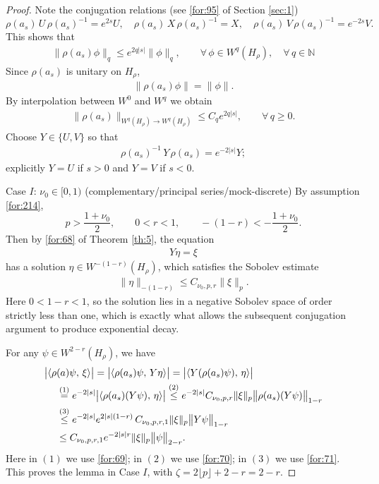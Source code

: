 \documentclass[11 pt]{amsart}
\newcommand{\NN}{\mathbb{N}}
\newcommand{\norm}[1]{\lVert#1\rVert}
\theoremstyle{definition}
\numberwithin{equation}{section}
\begin{document}
\begin{proof}
Note the conjugation relations (see \eqref{for:95} of Section \ref{sec:1})
\[
\rho(a_s)\,U\,\rho(a_s)^{-1}=e^{2s}U,\quad \rho(a_s)\,X\,\rho(a_s)^{-1}=X,\quad \rho(a_s)\,V\,\rho(a_s)^{-1}=e^{-2s}V.
\]
 This shows that
\begin{align*}
 \norm{\rho(a_s)\phi}_q\leq e^{2q|s|}\norm{\phi}_{q},\qquad \forall\,\phi\in W^{q}(H_\rho),\quad \forall\,q\in\NN
\end{align*}
Since $\rho(a_s)$ is unitary on $H_\rho$,
\begin{align*}
 \norm{\rho(a_s)\phi}=\norm{\phi}.
\end{align*}
By interpolation between $W^0$ and $W^q$ we obtain
\begin{align}\label{for:71}
 \|\rho(a_s)\|_{W^{q}(H_\rho)\to W^{q}(H_\rho)}\le C_qe^{2q|s|},\qquad \forall\, q\geq0.
\end{align}
Choose $Y\in\{U,V\}$ so that
\begin{align}\label{for:69}
\rho(a_{s})^{-1}\,Y\,\rho(a_s)=e^{-2|s|}Y;
\end{align}
explicitly $Y=U$ if $s>0$ and $Y=V$ if $s<0$.

Case $I$: $\nu_0\in [0,1)$ (complementary/principal series/mock-discrete)  By assumption \eqref{for:214},
\[
p>\frac{1+\nu_0}{2},\qquad 0<r<1,\qquad
-(1-r)<-\frac{1+\nu_0}{2}.
\]
 Then by \eqref{for:68} of Theorem \ref{th:5}, the equation
\begin{align}
 Y\eta=\xi
\end{align}
has a solution $\eta\in W^{-(1-r)}(H_\rho)$,  which satisfies the Sobolev estimate
\begin{align}\label{for:70}
 \|\eta \|_{-(1-r)} \leq C_{\nu_0,p,r} \| \xi \|_{p}.
\end{align}
Here \(0<1-r<1\), so the solution lies in a negative Sobolev space of order strictly less than one, which is exactly what allows the subsequent conjugation argument to produce exponential decay.

For any $\psi\in W^{2-r}(H_\rho)$, we have
\begin{align}\label{for:218}
 \big|\langle \rho&(a)\psi,\, \xi\rangle \big|=\big|\langle \rho(a_s)\psi,\, Y\eta\rangle \big|=\big|\langle Y(\rho(a_s)\psi),\, \eta\rangle \big|\notag\\
 &\overset{\text{(1)}}{=}e^{-2|s|}\big|\langle \rho(a_s)(Y\psi),\, \eta\rangle \big|\overset{\text{(2)}}{\leq} e^{-2|s|} C_{\nu_0,p,r} \| \xi \|_{p} \big\|\rho(a_s)(Y\psi)\big\|_{1-r}\notag\\
 &\overset{\text{(3)}}{\leq} e^{-2|s|} e^{2|s|(1-r)}\,C_{\nu_0,p,r,1} \| \xi \|_{p} \big\|Y\psi\big\|_{1-r}\notag\\
 &\leq C_{\nu_0,p,r,1} e^{-2|s|r}  \| \xi \|_{p} \big\|\psi\big\|_{2-r}.
\end{align}
Here in $(1)$ we use \eqref{for:69}; in $(2)$ we use \eqref{for:70}; in $(3)$ we use \eqref{for:71}. This proves the lemma in Case $I$, with
$\zeta=2\lfloor p\rfloor+2-r=2-r$.




\end{proof}
\end{document}
